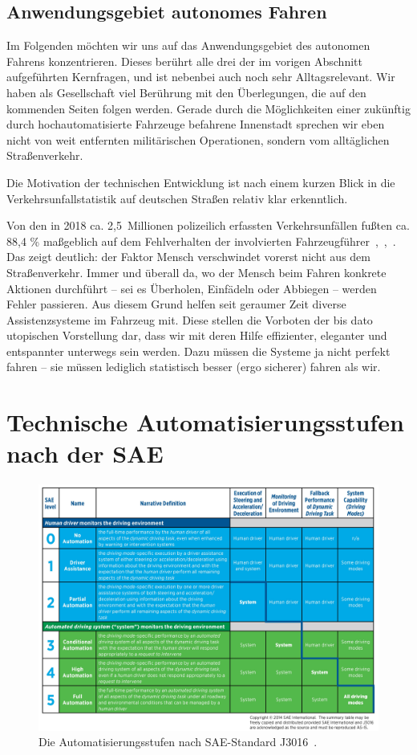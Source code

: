 \documentclass[twocolumn, german]{tum-article}
\begin{document}
\subsection{Anwendungsgebiet autonomes Fahren}
Im Folgenden möchten wir uns auf das Anwendungsgebiet des autonomen Fahrens konzentrieren.
Dieses berührt alle drei der im vorigen Abschnitt aufgeführten Kernfragen, und ist nebenbei auch noch sehr Alltagsrelevant.
Wir haben als Gesellschaft viel Berührung mit den Überlegungen, die auf den kommenden Seiten folgen werden.
Gerade durch die Möglichkeiten einer zukünftig durch hochautomatisierte Fahrzeuge befahrene Innenstadt sprechen wir eben nicht von weit entfernten militärischen Operationen, sondern vom alltäglichen Straßenverkehr.

Die Motivation der technischen Entwicklung ist nach einem kurzen Blick in die Verkehrsunfallstatistik auf deutschen Straßen relativ klar erkenntlich.

Von den in 2018 ca. 2,5~Millionen polizeilich erfassten Verkehrsunfällen fußten ca. 88,4 \% maßgeblich auf dem Fehlverhalten der involvierten Fahrzeugführer~\cite{kba-zulass},~\cite{destatis-grafik},~\cite{destatis-unfallaktuell}.
Das zeigt deutlich: der Faktor Mensch verschwindet vorerst nicht aus dem Straßenverkehr.
Immer und überall da, wo der Mensch beim Fahren konkrete Aktionen durchführt -- sei es Überholen, Einfädeln oder Abbiegen -- werden Fehler passieren.
Aus diesem Grund helfen seit geraumer Zeit diverse Assistenzsysteme im Fahrzeug mit.
Diese stellen die Vorboten der bis dato utopischen Vorstellung dar, dass wir mit deren Hilfe effizienter, eleganter und entspannter unterwegs sein werden.
Dazu müssen die Systeme ja nicht perfekt fahren -- sie müssen lediglich statistisch besser (ergo sicherer) fahren als wir.


\section{Technische Automatisierungsstufen nach der SAE}
\begin{figure}
	\includegraphics[width=\textwidth]{media/sae-summary}
	\caption{Die Automatisierungsstufen nach SAE-Standard J3016~\cite{sae-summary}.}
	\label{fig:sae-levels-img}
\end{figure}
\end{document}
